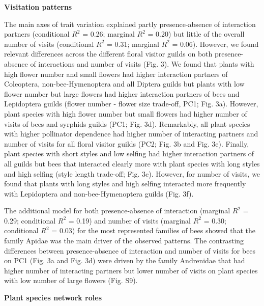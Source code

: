 \documentclass[
  12pt,
  a4paper,
]{article}
\begin{document}
\textbf{Visitation patterns}

The main axes of trait variation explained partly presence-absence of interaction partners (conditional \(R^{2}\) = 0.26; marginal \(R^{2}\) = 0.20) but little of the overall number of visits (conditional \(R^{2}\) = 0.31; marginal \(R^{2}\) = 0.06). However, we found relevant differences across the different floral visitor guilds on both presence-absence of interactions and number of visits (Fig. 3). We found that plants with high flower number and small flowers had higher interaction partners of Coleoptera, non-bee-Hymenoptera and all Diptera guilds but plants with low flower number but large flowers had higher interaction partners of bees and Lepidoptera guilds (flower number - flower size trade-off, PC1; Fig. 3a). However, plant species with high flower number but small flowers had higher number of visits of bees and syrphids guilds (PC1; Fig. 3d). Remarkably, all plant species with higher pollinator dependence had higher number of interacting partners and number of visits for all floral visitor guilds (PC2; Fig. 3b and Fig. 3e). Finally, plant species with short styles and low selfing had higher interaction partners of all guilds but bees that interacted clearly more with plant species with long styles and high selfing (style length trade-off; Fig. 3c). However, for number of visits, we found that plants with long styles and high selfing interacted more frequently with Lepidoptera and non-bee-Hymenoptera guilds (Fig. 3f).

The additional model for both presence-absence of interaction (marginal \(R^{2}\) = 0.29; conditional \(R^{2}\) = 0.19) and number of visits (marginal \(R^{2}\) = 0.30; conditional \(R^{2}\) = 0.03) for the most represented families of bees showed that the family Apidae was the main driver of the observed patterns. The contrasting differences between presence-absence of interaction and number of visits for bees on PC1 (Fig. 3a and Fig. 3d) were driven by the family Andrenidae that had higher number of interacting partners but lower number of visits on plant species with low number of large flowers (Fig. S9).

\textbf{Plant species network roles}
\end{document}
